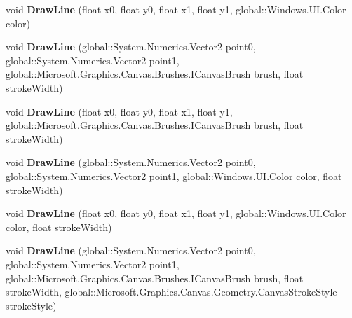 \begin{DoxyCompactItemize}
void {\bfseries Draw\+Line} (float x0, float y0, float x1, float y1, global\+::\+Windows.\+U\+I.\+Color color)
\item 
\mbox{\label{interface_microsoft_1_1_graphics_1_1_canvas_1_1_i_canvas_drawing_session_a9abdb1e2da9c7671f75ce437d7bcba48}} 
void {\bfseries Draw\+Line} (global\+::\+System.\+Numerics.\+Vector2 point0, global\+::\+System.\+Numerics.\+Vector2 point1, global\+::\+Microsoft.\+Graphics.\+Canvas.\+Brushes.\+I\+Canvas\+Brush brush, float stroke\+Width)
\item 
\mbox{\label{interface_microsoft_1_1_graphics_1_1_canvas_1_1_i_canvas_drawing_session_a29b60d9da085ea054a4384b079481a46}} 
void {\bfseries Draw\+Line} (float x0, float y0, float x1, float y1, global\+::\+Microsoft.\+Graphics.\+Canvas.\+Brushes.\+I\+Canvas\+Brush brush, float stroke\+Width)
\item 
\mbox{\label{interface_microsoft_1_1_graphics_1_1_canvas_1_1_i_canvas_drawing_session_a1fb8e14a555b12cee02481b049136a39}} 
void {\bfseries Draw\+Line} (global\+::\+System.\+Numerics.\+Vector2 point0, global\+::\+System.\+Numerics.\+Vector2 point1, global\+::\+Windows.\+U\+I.\+Color color, float stroke\+Width)
\item 
\mbox{\label{interface_microsoft_1_1_graphics_1_1_canvas_1_1_i_canvas_drawing_session_a6444612b873b32ed2cf5e81d5275c96e}} 
void {\bfseries Draw\+Line} (float x0, float y0, float x1, float y1, global\+::\+Windows.\+U\+I.\+Color color, float stroke\+Width)
\item 
\mbox{\label{interface_microsoft_1_1_graphics_1_1_canvas_1_1_i_canvas_drawing_session_a7127eba36145630ee36730eeffcc1427}} 
void {\bfseries Draw\+Line} (global\+::\+System.\+Numerics.\+Vector2 point0, global\+::\+System.\+Numerics.\+Vector2 point1, global\+::\+Microsoft.\+Graphics.\+Canvas.\+Brushes.\+I\+Canvas\+Brush brush, float stroke\+Width, global\+::\+Microsoft.\+Graphics.\+Canvas.\+Geometry.\+Canvas\+Stroke\+Style stroke\+Style)
\item 

\end{DoxyCompactItemize}
